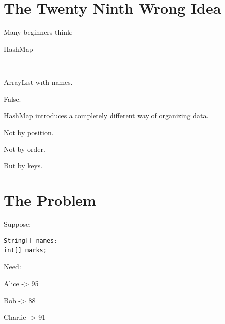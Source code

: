 \documentclass[11pt,a4paper]{book}
\begin{document}
\section{The Twenty Ninth Wrong Idea}

\begin{trap}

Many beginners think:


HashMap

=

ArrayList with names.


False.


HashMap introduces a completely
different way of organizing data.


Not by position.


Not by order.


But by keys.

\end{trap}


\section{The Problem}

Suppose:

\begin{verbatim} 
String[] names;
int[] marks;
\end{verbatim}


Need:


Alice -> 95

Bob -> 88

Charlie -> 91

\end{document}
